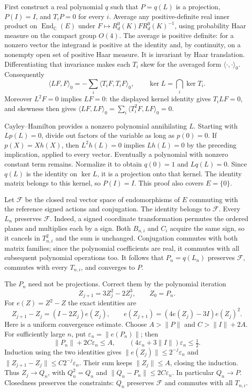 First construct a real polynomial $q$ such that $P=q(L)$ is a projection,
$P(I)=I$, and $T_iP=0$ for every $i$. Average any positive-definite real
inner product on $\operatorname{End}_{\mathbb C}(E)$ under
$F\mapsto R_d^0(K)F R_d^0(K)^{-1}$, using probability Haar measure on
the compact group $O(4)$. The average is positive definite: for a
nonzero vector the integrand is positive at the identity and, by
continuity, on a nonempty open set of positive Haar measure. It is
invariant by Haar translation. Differentiating that invariance makes
each $T_i$ skew for the averaged form $\langle\cdot,\cdot\rangle_0$.
Consequently
\[
       \langle LF,F\rangle_0=-\sum_i\langle T_iF,T_iF\rangle_0,
       \qquad \ker L=\bigcap_i\ker T_i.
\]
Moreover $L^2F=0$ implies $LF=0$: the displayed kernel identity gives
$T_iLF=0$, and skewness then gives
$\langle LF,LF\rangle_0=\sum_i\langle T_i^2F,LF\rangle_0=0$.

Cayley--Hamilton provides a nonzero polynomial annihilating $L$.
Starting with $Lp(L)=0$, divide out factors of the variable as long as
$p(0)=0$. If $p(X)=Xh(X)$, then $L^2h(L)=0$ implies $Lh(L)=0$ by the
preceding implication, applied to every vector. Eventually a polynomial
with nonzero constant term remains. Normalize it to obtain
$q(0)=1$ and $Lq(L)=0$. Since $q(L)$ is the identity on $\ker L$,
it is a projection onto that kernel. The identity matrix belongs to
this kernel, so $P(I)=I$. This proof also covers $E=\{0\}$.

Let $\mathcal F$ be the closed real vector space of endomorphisms of $E$
commuting with the reference signed actions and conjugation. The identity
belongs to $\mathcal F$. Every $L_n$ preserves $\mathcal F$.
Indeed, a signed coordinate transformation permutes the ordered planes
and multiplies each by a sign. Both $B_{n,i}$ and $C_i$ acquire the same
sign, so it cancels in $T_{n,i}^2$ and the sum is unchanged. Conjugation
commutes with both matrix families; since the polynomial coefficients
are real, it commutes with all subsequent polynomial operations too.
It follows that $P_n=q(L_n)$ preserves $\mathcal F$, commutes with
every $T_{n,i}$, and converges to $P$.

The $P_n$ need not be projections. Correct them by the polynomial
iteration
\[
       Z_{j+1}=3Z_j^2-2Z_j^3,\qquad Z_0=P_n.
\]
For $e(Z)=Z^2-Z$ the exact identities are
\[
 Z_{j+1}-Z_j=(I-2Z_j)e(Z_j),\qquad
 e(Z_{j+1})=(4e(Z_j)-3I)e(Z_j)^2.
\]
Here is a uniform convergence estimate. Choose $A>\|P\|$ and
$C>\|I\|+2A$. For sufficiently large $n$, put
$\varepsilon_n=\|e(P_n)\|$; then
\[
 \|P_n\|+2C\varepsilon_n\leq A,\qquad
 (4\varepsilon_n+3\|I\|)\varepsilon_n\leq\tfrac12.
\]
Induction using the two identities gives
$\|e(Z_j)\|\leq2^{-j}\varepsilon_n$ and
$\|Z_{j+1}-Z_j\|\leq C2^{-j}\varepsilon_n$.
Their sum keeps $\|Z_j\|\leq A$, closing the induction. Thus
$Z_j\to Q_n$, with $Q_n^2=Q_n$ and
$\|Q_n-P_n\|\leq2C\varepsilon_n$. In particular $Q_n\to P$.
Closedness preserves the constraints: $Q_n$ preserves $\mathcal F$
and commutes with all $T_{n,i}$.

